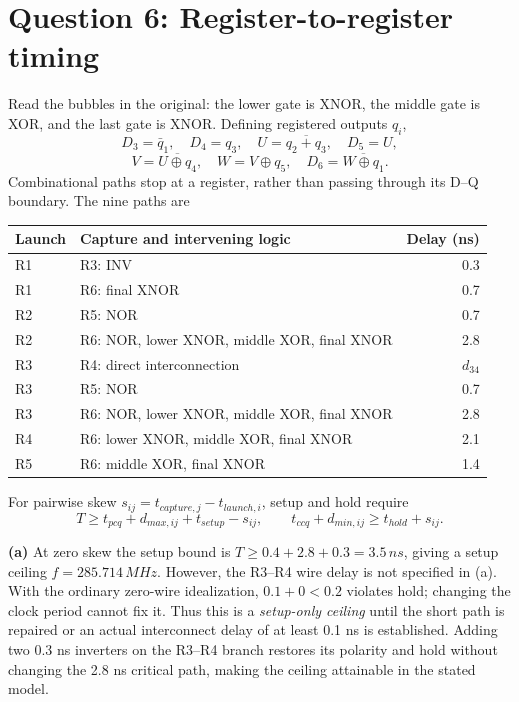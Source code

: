 \documentclass[10pt]{article}
\begin{document}
\newpage\section*{Question 6: Register-to-register timing}
Read the bubbles in the original: the lower gate is XNOR, the middle gate is XOR, and the last gate is XNOR. Defining registered outputs $q_i$,
\[D_3=\bar q_1,\quad D_4=q_3,\quad U=\overline{q_2+q_3},\quad D_5=U,\]
\[V=\overline{U\mathbin{\oplus}q_4},\quad W=V\mathbin{\oplus}q_5,\quad D_6=\overline{W\mathbin{\oplus}q_1}.\]
Combinational paths stop at a register, rather than passing through its D--Q boundary. The nine paths are
\begin{center}\begin{tabular}{llr}\toprule Launch&Capture and intervening logic&Delay (ns)\\\midrule
R1&R3: INV&0.3\\R1&R6: final XNOR&0.7\\R2&R5: NOR&0.7\\
R2&R6: NOR, lower XNOR, middle XOR, final XNOR&2.8\\
R3&R4: direct interconnection&$d_{34}$\\R3&R5: NOR&0.7\\
R3&R6: NOR, lower XNOR, middle XOR, final XNOR&2.8\\
R4&R6: lower XNOR, middle XOR, final XNOR&2.1\\R5&R6: middle XOR, final XNOR&1.4\\\bottomrule
\end{tabular}\end{center}
For pairwise skew $s_{ij}=t_{capture,j}-t_{launch,i}$, setup and hold require
\[T\ge t_{pcq}+d_{max,ij}+t_{setup}-s_{ij},\qquad t_{ccq}+d_{min,ij}\ge t_{hold}+s_{ij}.\]

\textbf{(a)} At zero skew the setup bound is $T\ge0.4+2.8+0.3=3.5\,ns$, giving a setup ceiling $f=285.714\,MHz$. However, the R3--R4 wire delay is not specified in (a). With the ordinary zero-wire idealization, $0.1+0<0.2$ violates hold; changing the clock period cannot fix it. Thus this is a \emph{setup-only ceiling} until the short path is repaired or an actual interconnect delay of at least 0.1 ns is established. Adding two 0.3 ns inverters on the R3--R4 branch restores its polarity and hold without changing the 2.8 ns critical path, making the ceiling attainable in the stated model.
\end{document}

